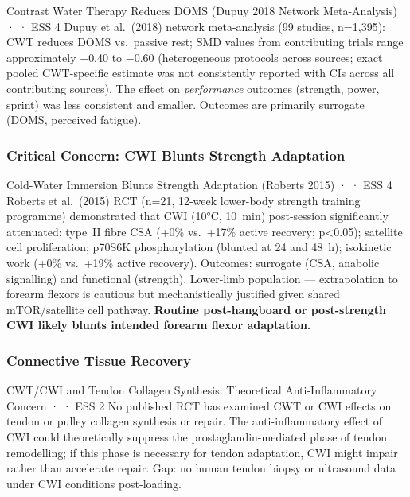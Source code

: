 \begin{evidencebox}{Contrast Water Therapy Reduces DOMS (Dupuy 2018 Network Meta-Analysis) · \evidencebacked · ESS 4}
Dupuy et al.\ (2018) network meta-analysis (99 studies, n=1,395): CWT reduces DOMS vs.\ passive rest; SMD values from contributing trials range approximately $-$0.40 to $-$0.60 (heterogeneous protocols across sources; exact pooled CWT-specific estimate was not consistently reported with CIs across all contributing sources). The effect on \emph{performance} outcomes (strength, power, sprint) was less consistent and smaller. Outcomes are primarily surrogate (DOMS, perceived fatigue). \cite{DDT+18}
\end{evidencebox}

\subsubsection*{Critical Concern: CWI Blunts Strength Adaptation}

\begin{evidencebox}{Cold-Water Immersion Blunts Strength Adaptation (Roberts 2015) · \evidencebacked · ESS 4}
Roberts et al.\ (2015) RCT (n=21, 12-week lower-body strength training programme) demonstrated that CWI (10°C, 10~min) post-session significantly attenuated: type~II fibre CSA (+0\% vs.\ +17\% active recovery; p<0.05); satellite cell proliferation; p70S6K phosphorylation (blunted at 24 and 48~h); isokinetic work (+0\% vs.\ +19\% active recovery). Outcomes: surrogate (CSA, anabolic signalling) and functional (strength). Lower-limb population --- extrapolation to forearm flexors is cautious but mechanistically justified given shared mTOR/satellite cell pathway. \textbf{Routine post-hangboard or post-strength CWI likely blunts intended forearm flexor adaptation.} \cite{RRM+15}
\end{evidencebox}

\subsubsection*{Connective Tissue Recovery}

\begin{bioplausbox}{CWT/CWI and Tendon Collagen Synthesis: Theoretical Anti-Inflammatory Concern · \bioplausible · ESS 2}
No published RCT has examined CWT or CWI effects on tendon or pulley collagen synthesis or repair. The anti-inflammatory effect of CWI could theoretically suppress the prostaglandin-mediated phase of tendon remodelling; if this phase is necessary for tendon adaptation, CWI might impair rather than accelerate repair. Gap: no human tendon biopsy or ultrasound data under CWI conditions post-loading.
\end{bioplausbox}

